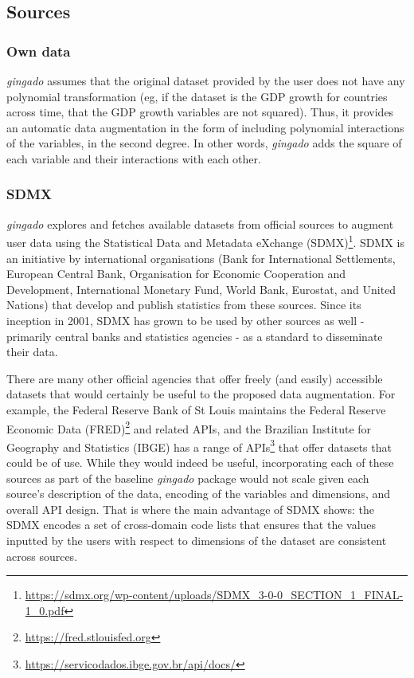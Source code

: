 \documentclass{article}
\begin{document}
\subsection{Sources}

\subsubsection{Own data}

\textit{gingado} assumes that the original dataset provided by the user does not have any polynomial transformation (eg, if the dataset is the GDP growth for countries across time, that the GDP growth variables are not squared). Thus, it provides an automatic data augmentation in the form of including polynomial interactions of the variables, in the second degree. In other words, \textit{gingado} adds the square of each variable and their interactions with each other.

\subsubsection{SDMX}

\textit{gingado} explores and fetches available datasets from official sources to augment user data using the Statistical Data and Metadata eXchange (SDMX)\footnote{\url{https://sdmx.org/wp-content/uploads/SDMX_3-0-0_SECTION_1_FINAL-1_0.pdf}}. SDMX is an initiative by international organisations (Bank for International Settlements, European Central Bank, Organisation for Economic Cooperation and Development, International Monetary Fund, World Bank, Eurostat, and United Nations) that develop and publish statistics from these sources. Since its inception in 2001, SDMX has grown to be used by other sources as well - primarily central banks and statistics agencies - as a standard to disseminate their data.

There are many other official agencies that offer freely (and easily) accessible datasets that would certainly be useful to the proposed data augmentation. For example, the Federal Reserve Bank of St Louis maintains the Federal Reserve Economic Data (FRED)\footnote{\url{https://fred.stlouisfed.org}} and related APIs, and the Brazilian Institute for Geography and Statistics (IBGE) has a range of APIs\footnote{\url{https://servicodados.ibge.gov.br/api/docs/}} that offer datasets that could be of use. While they would indeed be useful, incorporating each of these sources as part of the baseline \textit{gingado} package would not scale given each source's description of the data, encoding of the variables and dimensions, and overall API design.  That is where the main advantage of SDMX shows: the SDMX encodes a set of cross-domain code lists that ensures that the values inputted by the users with respect to dimensions of the dataset are consistent across sources.
\end{document}
